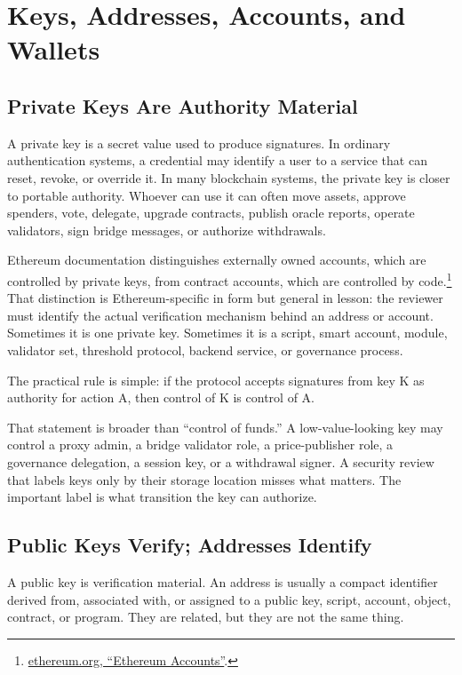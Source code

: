 \section{Keys, Addresses, Accounts, and Wallets}

\subsection{Private Keys Are Authority Material}

A private key is a secret value used to produce signatures. In ordinary authentication systems, a credential may identify a user to a service that can reset, revoke, or override it. In many blockchain systems, the private key is closer to portable authority. Whoever can use it can often move assets, approve spenders, vote, delegate, upgrade contracts, publish oracle reports, operate validators, sign bridge messages, or authorize withdrawals.

Ethereum documentation distinguishes externally owned accounts, which are controlled by private keys, from contract accounts, which are controlled by code.\footnote{\href{https://ethereum.org/developers/docs/accounts/}{ethereum.org, ``Ethereum Accounts''}.} That distinction is Ethereum-specific in form but general in lesson: the reviewer must identify the actual verification mechanism behind an address or account. Sometimes it is one private key. Sometimes it is a script, smart account, module, validator set, threshold protocol, backend service, or governance process.

The practical rule is simple: if the protocol accepts signatures from key K as authority for action A, then control of K is control of A.

That statement is broader than ``control of funds.'' A low-value-looking key may control a proxy admin, a bridge validator role, a price-publisher role, a governance delegation, a session key, or a withdrawal signer. A security review that labels keys only by their storage location misses what matters. The important label is what transition the key can authorize.

\subsection{Public Keys Verify; Addresses Identify}

A public key is verification material. An address is usually a compact identifier derived from, associated with, or assigned to a public key, script, account, object, contract, or program. They are related, but they are not the same thing.

